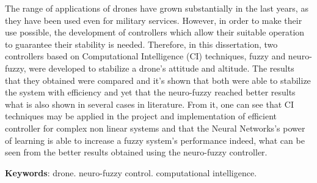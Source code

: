 %
%

\begin{resumo}[Abstract]

The range of applications of drones have grown substantially in the last years, as they have been used even for military services. However, in order to make their use possible, the development of controllers which allow their suitable operation to guarantee their stability is needed. Therefore, in this dissertation, two controllers based on Computational Intelligence (CI) techniques, fuzzy and neuro-fuzzy, were developed to stabilize a drone's attitude and altitude. The results that they obtained were compared and it's shown that both were able to stabilize the system with efficiency and yet that the neuro-fuzzy reached better results what is also shown in several cases in literature. From it, one can see that CI techniques may be applied in the project and implementation of efficient controller for complex non linear systems and that the Neural Networks's power of learning is able to increase a fuzzy system's performance indeed, what can be seen from the better results obtained using the neuro-fuzzy controller.

\textbf{Keywords}: drone. neuro-fuzzy control. computational intelligence.

\end{resumo}




